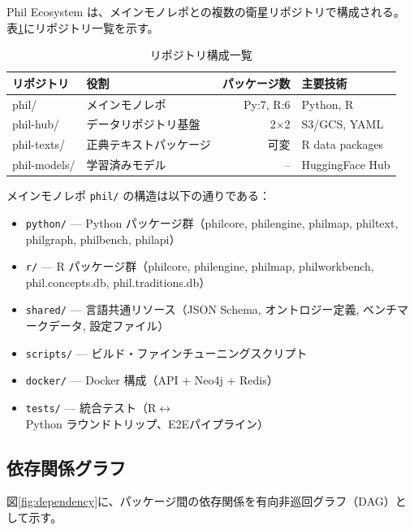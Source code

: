 \documentclass[a4paper,11pt]{ltjsarticle}
\begin{document}
Phil Ecosystem は、メインモノレポとの複数の衛星リポジトリで構成される。
表\ref{tab:repos}にリポジトリ一覧を示す。

\begin{table}[H]
\centering
\caption{リポジトリ構成一覧}
\label{tab:repos}
\small
\begin{tabular}{llrl}
\toprule
\textbf{リポジトリ} & \textbf{役割} & \textbf{パッケージ数} & \textbf{主要技術} \\
\midrule
phil/ & メインモノレポ & Py:7, R:6 & Python, R \\
phil-hub/ & データリポジトリ基盤 & 2$\times$2 & S3/GCS, YAML \\
phil-texts/ & 正典テキストパッケージ & 可変 & R data packages \\
phil-models/ & 学習済みモデル & -- & HuggingFace Hub \\
\bottomrule
\end{tabular}
\end{table}

メインモノレポ \texttt{phil/} の構造は以下の通りである：

\begin{itemize}[leftmargin=2em]
  \item \texttt{python/} --- Python パッケージ群（philcore, philengine, philmap, philtext, philgraph, philbench, philapi）
  \item \texttt{r/} --- R パッケージ群（philcore, philengine, philmap, philworkbench, phil.concepts.db, phil.traditions.db）
  \item \texttt{shared/} --- 言語共通リソース（JSON Schema, オントロジー定義, ベンチマークデータ, 設定ファイル）
  \item \texttt{scripts/} --- ビルド・ファインチューニングスクリプト
  \item \texttt{docker/} --- Docker 構成（API + Neo4j + Redis）
  \item \texttt{tests/} --- 統合テスト（R$\leftrightarrow$Python ラウンドトリップ、E2Eパイプライン）
\end{itemize}

\subsection{依存関係グラフ}

図\ref{fig:dependency}に、パッケージ間の依存関係を有向非巡回グラフ（DAG）として示す。
\end{document}
